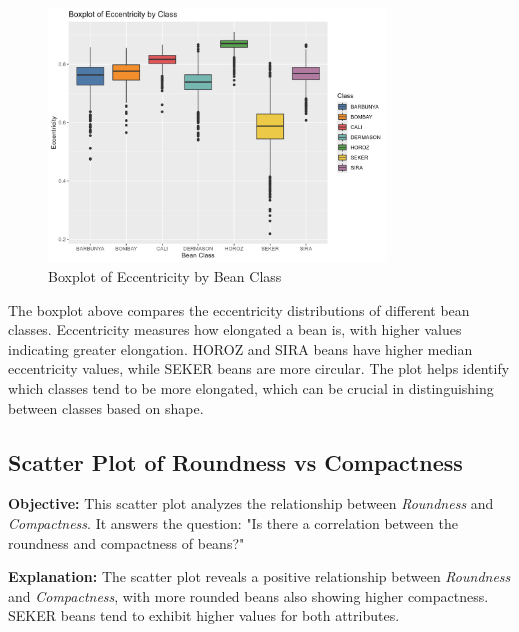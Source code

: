 \documentclass[a4paper,12pt]{article}
\begin{document}
\begin{figure}[H]
    \centering
    \includegraphics[width=0.8\textwidth]{graphs/boxplot_eccentricity.png}
    \caption{Boxplot of Eccentricity by Bean Class}
    \label{fig:boxplot_eccentricity}
\end{figure}
The boxplot above compares the eccentricity distributions of different bean classes. Eccentricity measures how elongated a bean is, with higher values indicating greater elongation. HOROZ and SIRA beans have higher median eccentricity values, while SEKER beans are more circular. The plot helps identify which classes tend to be more elongated, which can be crucial in distinguishing between classes based on shape.


\newpage
\subsection{Scatter Plot of Roundness vs Compactness}
\noindent\textbf{Objective:} This scatter plot analyzes the relationship between \textit{Roundness} and \textit{Compactness}. It answers the question: "Is there a correlation between the roundness and compactness of beans?"

\noindent\textbf{Explanation:} The scatter plot reveals a positive relationship between \textit{Roundness} and \textit{Compactness}, with more rounded beans also showing higher compactness. SEKER beans tend to exhibit higher values for both attributes.
\end{document}
